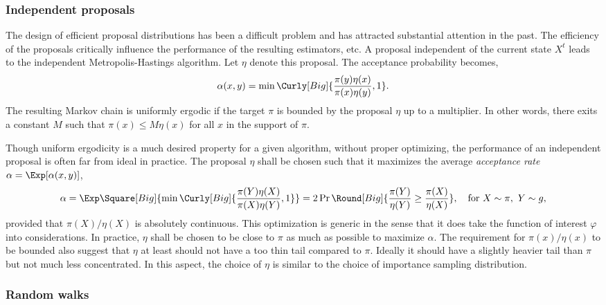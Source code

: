 \subsubsection{Independent proposals}
\label{ssub:Independent proposals}

The design of efficient proposal distributions has been a difficult problem
and has attracted substantial attention in the past. The efficiency of the
proposals critically influence the performance of the resulting estimators,
etc. A proposal independent of the current state $X^t$ leads to the
independent Metropolis-Hastings algorithm. Let $\eta$ denote this proposal.
The acceptance probability becomes,
\begin{equation}
  \alpha(x,y) = \min\Curly[Big]{\frac{\pi(y)\eta(x)}{\pi(x)\eta(y)},1}.
\end{equation}
The resulting Markov chain is uniformly ergodic if the target $\pi$ is bounded
by the proposal $\eta$ up to a multiplier. In other words, there exits a
constant $M$ such that $\pi(x)\le M\eta(x)$ for all $x$ in the support of
$\pi$.

Though uniform ergodicity is a much desired property for a given algorithm,
without proper optimizing, the performance of an independent proposal is often
far from ideal in practice. The proposal $\eta$ shall be chosen such that it
maximizes the average \emph{acceptance rate} $\alpha = \Exp[\alpha(x,y)]$,
\begin{equation}
  \alpha
  = \Exp\Square[Big]{\min\Curly[Big]{\frac{\pi(Y)\eta(X)}{\pi(X)\eta(Y)},1}}
  = 2\Pr\Round[Big]{\frac{\pi(Y)}{\eta(Y)}\ge\frac{\pi(X)}{\eta(X)}},\quad
  \text{for } X\sim\pi,\ Y\sim g,
\end{equation}
provided that $\pi(X)/\eta(X)$ is absolutely continuous. This optimization is
generic in the sense that it does take the function of interest $\varphi$ into
considerations. In practice, $\eta$ shall be chosen to be close to $\pi$ as
much as possible to maximize $\alpha$. The requirement for $\pi(x)/\eta(x)$ to
be bounded also suggest that $\eta$ at least should not have a too thin tail
compared to $\pi$. Ideally it should have a slightly heavier tail than $\pi$
but not much less concentrated. In this aspect, the choice of $\eta$ is
similar to the choice of importance sampling distribution.

\subsubsection{Random walks}
\label{ssub:Random walks}


